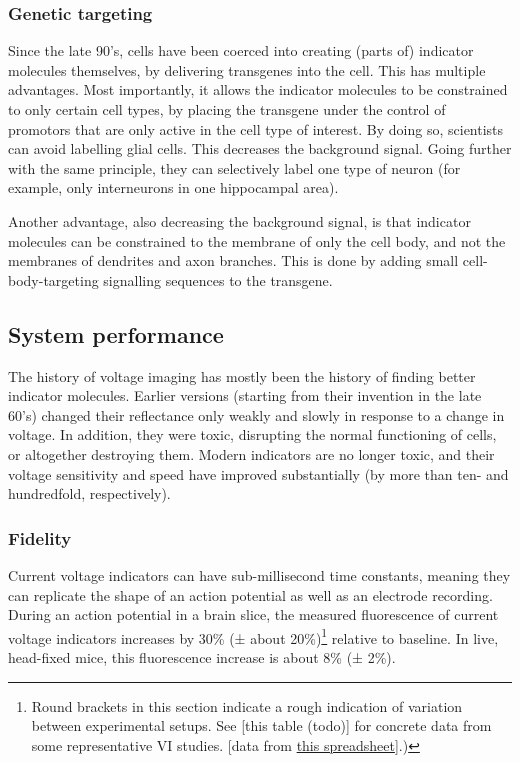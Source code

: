 \subsubsection{Genetic targeting}

Since the late 90's, cells have been coerced into creating (parts of) indicator molecules themselves, by delivering transgenes into the cell. This has multiple advantages. Most importantly, it allows the indicator molecules to be constrained to only certain cell types, by placing the transgene under the control of promotors that are only active in the cell type of interest. By doing so, scientists can avoid labelling glial cells. This decreases the background signal. Going further with the same principle, they can selectively label one type of neuron (for example, only interneurons in one hippocampal area).

Another advantage, also decreasing the background signal, is that indicator molecules can be constrained to the membrane of only the cell body, and not the membranes of dendrites and axon branches. This is done by adding small cell-body-targeting signalling sequences to the transgene.



\subsection{System performance}

The history of voltage imaging has mostly been the history of finding better indicator molecules. Earlier versions (starting from their invention in the late 60's) changed their reflectance only weakly and slowly in response to a change in voltage. In addition, they were toxic, disrupting the normal functioning of cells, or altogether destroying them.
Modern indicators are no longer toxic, and their voltage sensitivity and speed have improved substantially (by more than ten- and hundredfold, respectively).


\subsubsection{Fidelity}

Current voltage indicators can have sub-millisecond time constants, meaning they can replicate the shape of an action potential as well as an electrode recording. During an action potential in a brain slice, the measured fluorescence of current voltage indicators increases by 30\% (± about 20\%)\footnote{
    Round brackets in this section indicate a rough indication of variation between experimental setups.
    See [this table (todo)] for concrete data from some representative VI studies.
    [data from \hyperlink{https://docs.google.com/spreadsheets/d/1W9Y3az4i1xdvahpdyqtsTG8F81LXK2T6wzRgsXHN3z0/edit}{this spreadsheet}].)
}
relative to baseline. In live, head-fixed mice, this fluorescence increase is about 8\% (± 2\%).

